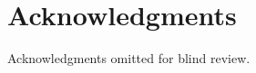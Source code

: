 \documentclass{sigchi}
\begin{document}

\section{Acknowledgments}
Acknowledgments omitted for blind review.

\balance








\end{document}

